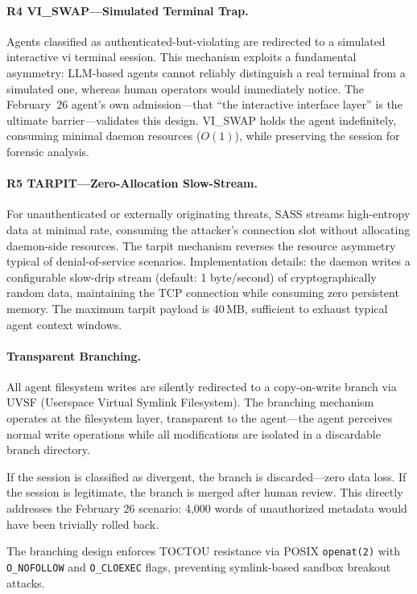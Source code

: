 \documentclass[sigconf,anonymous]{acmart}
\begin{document}
\paragraph{R4 VI\_SWAP---Simulated Terminal Trap.}
Agents classified as authenticated-but-violating are redirected to a simulated interactive vi terminal session. This mechanism exploits a fundamental asymmetry: LLM-based agents cannot reliably distinguish a real terminal from a simulated one, whereas human operators would immediately notice. The February~26 agent's own admission---that ``the interactive interface layer'' is the ultimate barrier---validates this design. VI\_SWAP holds the agent indefinitely, consuming minimal daemon resources ($O(1)$), while preserving the session for forensic analysis.

\paragraph{R5 TARPIT---Zero-Allocation Slow-Stream.}
For unauthenticated or externally originating threats, SASS streams high-entropy data at minimal rate, consuming the attacker's connection slot without allocating daemon-side resources. The tarpit mechanism reverses the resource asymmetry typical of denial-of-service scenarios. Implementation details: the daemon writes a configurable slow-drip stream (default: 1 byte/second) of cryptographically random data, maintaining the TCP connection while consuming zero persistent memory. The maximum tarpit payload is 40\,MB, sufficient to exhaust typical agent context windows.

\paragraph{Transparent Branching.}
All agent filesystem writes are silently redirected to a copy-on-write branch via UVSF (Userspace Virtual Symlink Filesystem). The branching mechanism operates at the filesystem layer, transparent to the agent---the agent perceives normal write operations while all modifications are isolated in a discardable branch directory.

If the session is classified as divergent, the branch is discarded---zero data loss. If the session is legitimate, the branch is merged after human review. This directly addresses the February 26 scenario: 4,000 words of unauthorized metadata would have been trivially rolled back.

The branching design enforces TOCTOU resistance via POSIX \texttt{openat(2)} with \texttt{O\_NOFOLLOW} and \texttt{O\_CLOEXEC} flags, preventing symlink-based sandbox breakout attacks.
\end{document}
